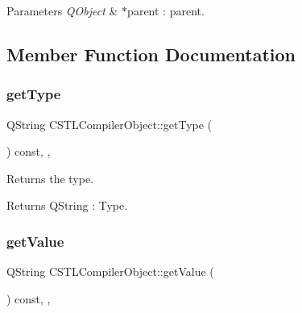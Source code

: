 \begin{DoxyParams}{Parameters}
{\em Q\+Object} & $\ast$parent \+: parent. \\
\hline
\end{DoxyParams}


\subsection{Member Function Documentation}
\mbox{\label{class_c_s_t_l_compiler_object_a99e470396326c2895ffc63a5bc233add}} 
\subsubsection{\texorpdfstring{get\+Type}{getType}}
{\footnotesize\ttfamily Q\+String C\+S\+T\+L\+Compiler\+Object\+::get\+Type (\begin{DoxyParamCaption}{ }\end{DoxyParamCaption}) const\hspace{0.3cm}{\ttfamily [inline]}, {\ttfamily [slot]}, {\ttfamily [noexcept]}}



Returns the type. 

\begin{DoxyReturn}{Returns}
Q\+String \+: Type. 
\end{DoxyReturn}
\mbox{\label{class_c_s_t_l_compiler_object_ae09aa0cd4fe3da1d07cec05f734d2fab}} 
\subsubsection{\texorpdfstring{get\+Value}{getValue}}
{\footnotesize\ttfamily Q\+String C\+S\+T\+L\+Compiler\+Object\+::get\+Value (\begin{DoxyParamCaption}{ }\end{DoxyParamCaption}) const\hspace{0.3cm}{\ttfamily [inline]}, {\ttfamily [slot]}, {\ttfamily [noexcept]}}



